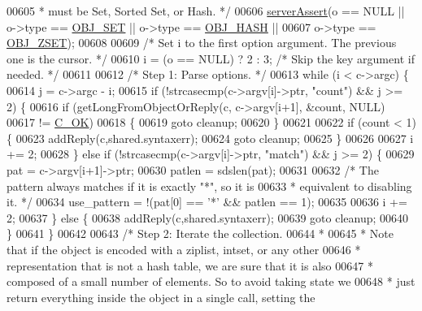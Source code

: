 \begin{DoxyCode}
00605 \textcolor{comment}{     * must be Set, Sorted Set, or Hash. */}
00606     \hyperlink{server_8h_a88114b5169b4c382df6b56506285e56a}{serverAssert}(o == NULL || o->type == \hyperlink{server_8h_a8d179375a4aac33d3fa7aa80c8ccc75f}{OBJ\_SET} || o->type == 
      \hyperlink{server_8h_a87c05ba4f7f36741864277f02a4423fb}{OBJ\_HASH} ||
00607                 o->type == \hyperlink{server_8h_a8c356422ddbc03bd77694880a30a1953}{OBJ\_ZSET});
00608 
00609     \textcolor{comment}{/* Set i to the first option argument. The previous one is the cursor. */}
00610     i = (o == NULL) ? 2 : 3; \textcolor{comment}{/* Skip the key argument if needed. */}
00611 
00612     \textcolor{comment}{/* Step 1: Parse options. */}
00613     \textcolor{keywordflow}{while} (i < c->argc) \{
00614         j = c->argc - i;
00615         \textcolor{keywordflow}{if} (!strcasecmp(c->argv[i]->ptr, \textcolor{stringliteral}{"count"}) && j >= 2) \{
00616             \textcolor{keywordflow}{if} (getLongFromObjectOrReply(c, c->argv[i+1], &count, NULL)
00617                 != \hyperlink{server_8h_a303769ef1065076e68731584e758d3e1}{C\_OK})
00618             \{
00619                 \textcolor{keywordflow}{goto} cleanup;
00620             \}
00621 
00622             \textcolor{keywordflow}{if} (count < 1) \{
00623                 addReply(c,shared.syntaxerr);
00624                 \textcolor{keywordflow}{goto} cleanup;
00625             \}
00626 
00627             i += 2;
00628         \} \textcolor{keywordflow}{else} \textcolor{keywordflow}{if} (!strcasecmp(c->argv[i]->ptr, \textcolor{stringliteral}{"match"}) && j >= 2) \{
00629             pat = c->argv[i+1]->ptr;
00630             patlen = sdslen(pat);
00631 
00632             \textcolor{comment}{/* The pattern always matches if it is exactly "*", so it is}
00633 \textcolor{comment}{             * equivalent to disabling it. */}
00634             use\_pattern = !(pat[0] == \textcolor{stringliteral}{'*'} && patlen == 1);
00635 
00636             i += 2;
00637         \} \textcolor{keywordflow}{else} \{
00638             addReply(c,shared.syntaxerr);
00639             \textcolor{keywordflow}{goto} cleanup;
00640         \}
00641     \}
00642 
00643     \textcolor{comment}{/* Step 2: Iterate the collection.}
00644 \textcolor{comment}{     *}
00645 \textcolor{comment}{     * Note that if the object is encoded with a ziplist, intset, or any other}
00646 \textcolor{comment}{     * representation that is not a hash table, we are sure that it is also}
00647 \textcolor{comment}{     * composed of a small number of elements. So to avoid taking state we}
00648 \textcolor{comment}{     * just return everything inside the object in a single call, setting the}

\end{DoxyCode}
